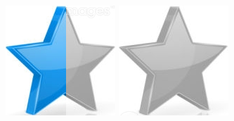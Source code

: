 \documentclass[10pt,a4paper,sans]{article}
\begin{document}
\begin{minipage}[t]{0.28\textwidth}
\begin{mdframed}[style=cadreCompetences]
\begin{itemize}
{                    \includegraphics[scale=0.25]{img/half_star.png} \hspace{-0.22cm}
                    \includegraphics[scale=0.25]{img/empty_star.png}}
            \end{itemize}

\end{mdframed}
\end{minipage}
\end{document}
